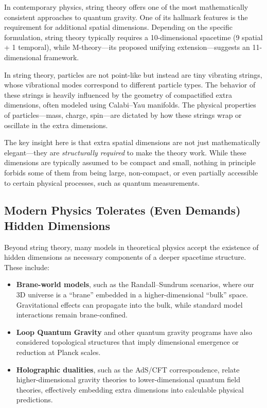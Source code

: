 \documentclass[12pt]{article}
\begin{document}
In contemporary physics, string theory offers one of the most mathematically consistent approaches to quantum gravity. One of its hallmark features is the requirement for additional spatial dimensions. Depending on the specific formulation, string theory typically requires a 10-dimensional spacetime (9 spatial + 1 temporal), while M-theory—its proposed unifying extension—suggests an 11-dimensional framework.

In string theory, particles are not point-like but instead are tiny vibrating strings, whose vibrational modes correspond to different particle types. The behavior of these strings is heavily influenced by the geometry of compactified extra dimensions, often modeled using Calabi–Yau manifolds. The physical properties of particles—mass, charge, spin—are dictated by how these strings wrap or oscillate in the extra dimensions.

The key insight here is that extra spatial dimensions are not just mathematically elegant—they are \textit{structurally required} to make the theory work. While these dimensions are typically assumed to be compact and small, nothing in principle forbids some of them from being large, non-compact, or even partially accessible to certain physical processes, such as quantum measurements.


\subsection{Modern Physics Tolerates (Even Demands) Hidden Dimensions}

Beyond string theory, many models in theoretical physics accept the existence of hidden dimensions as necessary components of a deeper spacetime structure. These include:

\begin{itemize}
    \item \textbf{Brane-world models}, such as the Randall–Sundrum scenarios, where our 3D universe is a ``brane'' embedded in a higher-dimensional ``bulk'' space. Gravitational effects can propagate into the bulk, while standard model interactions remain brane-confined.
    
    \item \textbf{Loop Quantum Gravity} and other quantum gravity programs have also considered topological structures that imply dimensional emergence or reduction at Planck scales.
    
    \item \textbf{Holographic dualities}, such as the AdS/CFT correspondence, relate higher-dimensional gravity theories to lower-dimensional quantum field theories, effectively embedding extra dimensions into calculable physical predictions.
\end{itemize}
\end{document}
